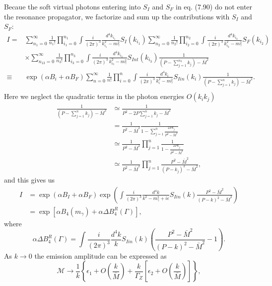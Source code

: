Becaue the soft virtual photons entering into $S_I$ and $S_F$ in eq. (7.90) do not enter the resonance propagator, we factorize and sum up the contributions with $S_I$ and $S_F$:
\begin{align}
I=&\sum_{n_1=0}^{\infty}\frac{1}{n_1!}\prod_{i_1=0}^{n_1}\int\frac{i}{(2\pi)^3}\frac{d^4k_{i_1}}{k_{i_1}^2-m^2_\gamma}S_I(k_{i_1})\sum_{n_2=0}^{\infty}\frac{1}{n_2!}\prod_{i_2=0}^{n_2}\int\frac{i}{(2\pi)^3}\frac{d^4k_{i_2}}{k_{i_2}^2-m^2_\gamma}S_F(k_{i_2})\nonumber\\
&\times\sum_{n_13=0}^{\infty}\frac{1}{n_3!}\prod_{i_3=0}^{n_3}\int\frac{i}{(2\pi)^3}\frac{d^4k_{i_3}}{k_{i_3}^2-m^2_\gamma}S_{Int}(k_{i_3})\frac{1}{\left(P-\sum_{j=1}^{n_3}k_j\right)-\bar{M}^2}\nonumber\\
\equiv&\exp(\alpha B_i+\alpha B_F)\sum_{n=0}^{\infty}\frac{1}{n!}
\prod_{i=0}^{n}\int\frac{i}{(2\pi)^3}\frac{d^4k_i}{k_i^2-m^2_\gamma}S_{Iin}(k_i)\frac{1}{\left(P-\sum_{j=1}^{n}k_j\right)-\bar{M}^2}.\nonumber\\
\end{align}
Here we neglect the quadratic terms in the photon energies $O(k_ik_j)$
\begin{align}
\frac{1}{\left(P-\sum_{j=1}^{n}k_j\right)-\bar{M}^2}&\simeq\frac{1}{P^2-2P\sum_{j=1}^{n}k_j-\bar{M}^2}\nonumber\\
&=\frac{1}{P^2-\bar{M}^2}\frac{1}{1-\sum_{j=1}^{n}\frac{2Pk_j}{P^2-\bar{M}^2}}\nonumber\\
&\simeq\frac{1}{P^2-\bar{M}^2}\prod_{j=1}^{n}\frac{1}{1-\frac{2Pk_j}{P^2-\bar{M}^2}}\nonumber\\
&\simeq\frac{1}{P^2-\bar{M}^2}\prod_{j=1}^{n}\frac{P^2-\bar{M}^2}{(P-k_j)^2-\bar{M}^2},
\end{align}
and this gives us
\begin{align}
I&=\exp(\alpha B_I+\alpha B_F)\exp\left( \int\frac{i}{(2\pi)^3}\frac{d^4k}{k^2-m_\gamma^2+i\epsilon}S_{Iin}(k)\frac{P^2-\bar{M}^2}{(P-k)^2-\bar{M}^2} \right)\nonumber\\
&=\exp[\alpha B_4(m_\gamma)+\alpha\Delta B_4^R(\Gamma)],
\end{align}
where
\begin{equation}
\alpha\Delta B^R_4(\Gamma)=\int\frac{i}{(2\pi)^3}\frac{d^4k}{k}S_{Iin}(k)\left(\frac{P^2-\bar{M}^2}{(P-k)^2-\bar{M}^2}-1\right).
\end{equation}
As $k\to 0$ the emission amplitude can be expressed as
\begin{equation*}
\mathcal{M}\to\frac{1}{k}\left\{ \epsilon_1+O\left(\frac{k}{\bar{M}}\right)+\frac{k}{\Gamma_Z}\left[\epsilon_2+O\left(\frac{k}{\bar{M}}\right)\right] \right\},
\end{equation*}
